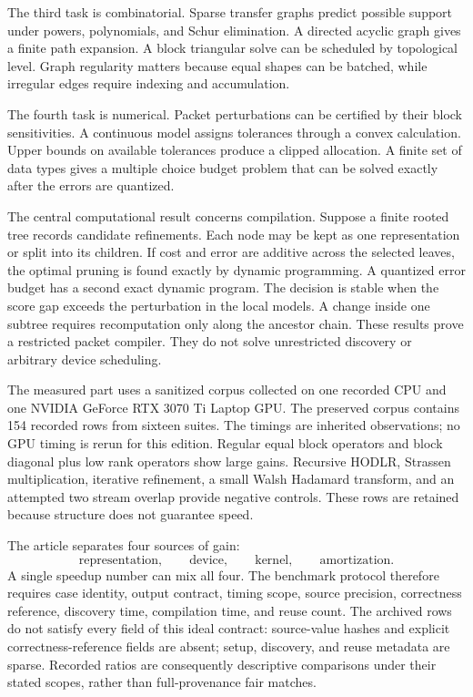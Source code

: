 The third task is combinatorial. Sparse transfer graphs predict possible support under powers, polynomials, and Schur elimination. A directed acyclic graph gives a finite path expansion. A block triangular solve can be scheduled by topological level. Graph regularity matters because equal shapes can be batched, while irregular edges require indexing and accumulation.

The fourth task is numerical. Packet perturbations can be certified by their block sensitivities. A continuous model assigns tolerances through a convex calculation. Upper bounds on available tolerances produce a clipped allocation. A finite set of data types gives a multiple choice budget problem that can be solved exactly after the errors are quantized.

The central computational result concerns compilation. Suppose a finite rooted tree records candidate refinements. Each node may be kept as one representation or split into its children. If cost and error are additive across the selected leaves, the optimal pruning is found exactly by dynamic programming. A quantized error budget has a second exact dynamic program. The decision is stable when the score gap exceeds the perturbation in the local models. A change inside one subtree requires recomputation only along the ancestor chain. These results prove a restricted packet compiler. They do not solve unrestricted discovery or arbitrary device scheduling.

The measured part uses a sanitized corpus collected on one recorded CPU and one NVIDIA GeForce RTX 3070 Ti Laptop GPU. The preserved corpus contains 154 recorded rows from sixteen suites. The timings are inherited observations; no GPU timing is rerun for this edition. Regular equal block operators and block diagonal plus low rank operators show large gains. Recursive HODLR, Strassen multiplication, iterative refinement, a small Walsh Hadamard transform, and an attempted two stream overlap provide negative controls. These rows are retained because structure does not guarantee speed.

The article separates four sources of gain:
\[
\text{representation},
\qquad
\text{device},
\qquad
\text{kernel},
\qquad
\text{amortization}.
\]
A single speedup number can mix all four. The benchmark protocol therefore requires case identity, output contract, timing scope, source precision, correctness reference, discovery time, compilation time, and reuse count. The archived rows do not satisfy every field of this ideal contract: source-value hashes and explicit correctness-reference fields are absent; setup, discovery, and reuse metadata are sparse. Recorded ratios are consequently descriptive comparisons under their stated scopes, rather than full-provenance fair matches.


